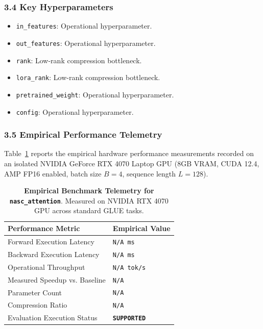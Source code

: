 \subsubsection*{3.4 Key Hyperparameters}
\begin{itemize}
    \item \texttt{in\_features}: Operational hyperparameter.
    \item \texttt{out\_features}: Operational hyperparameter.
    \item \texttt{rank}: Low-rank compression bottleneck.
    \item \texttt{lora\_rank}: Low-rank compression bottleneck.
    \item \texttt{pretrained\_weight}: Operational hyperparameter.
    \item \texttt{config}: Operational hyperparameter.
\end{itemize}

\subsubsection*{3.5 Empirical Performance Telemetry}
Table~\ref{tab:telemetry_nasc\_attention} reports the empirical hardware performance measurements recorded on an isolated NVIDIA GeForce RTX 4070 Laptop GPU (8GB VRAM, CUDA 12.4, AMP FP16 enabled, batch size $B=4$, sequence length $L=128$).

\begin{table}[h]
\centering
\small
\caption{\textbf{Empirical Benchmark Telemetry for \texttt{nasc\_attention}}. Measured on NVIDIA RTX 4070 GPU across standard GLUE tasks.}
\label{tab:telemetry_nasc\_attention}
\begin{tabularx}{\columnwidth}{lX}
\toprule
\textbf{Performance Metric} & \textbf{Empirical Value} \\
\midrule
Forward Execution Latency & \texttt{N/A ms} \\
Backward Execution Latency & \texttt{N/A ms} \\
Operational Throughput & \texttt{N/A tok/s} \\
Measured Speedup vs. Baseline & \texttt{N/A} \\
Parameter Count & \texttt{N/A} \\
Compression Ratio & \texttt{N/A} \\
Evaluation Execution Status & \textbf{\texttt{SUPPORTED}} \\
\bottomrule
\end{tabularx}
\end{table}

